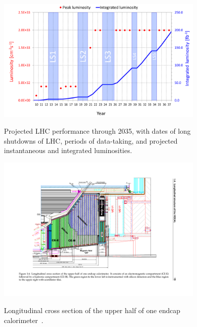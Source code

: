 \begin{figure}[!ht]
    \begin{center}  
    \includegraphics[width=0.9\textwidth]{Fig/fig_HGCAL/LHCb-to-2037}\\
    \caption{Projected LHC performance through 2035, with dates of long shutdowns of LHC, periods of data-taking, and projected instantaneous and integrated luminosities.}
    \label{fig:Proj}
    \end{center}
\end{figure}

\begin{figure}[!ht]
    \begin{center}  
    \includegraphics[width=0.9\textwidth]{Fig/fig_HGCAL/HGCAL-Longitudinal-section}\\
    \caption{Longitudinal cross section of the upper half of one endcap calorimeter~\cite{Collaboration:2293646}.}
    \label{fig:HGCAL-longitudinal}
    \end{center}
\end{figure}

